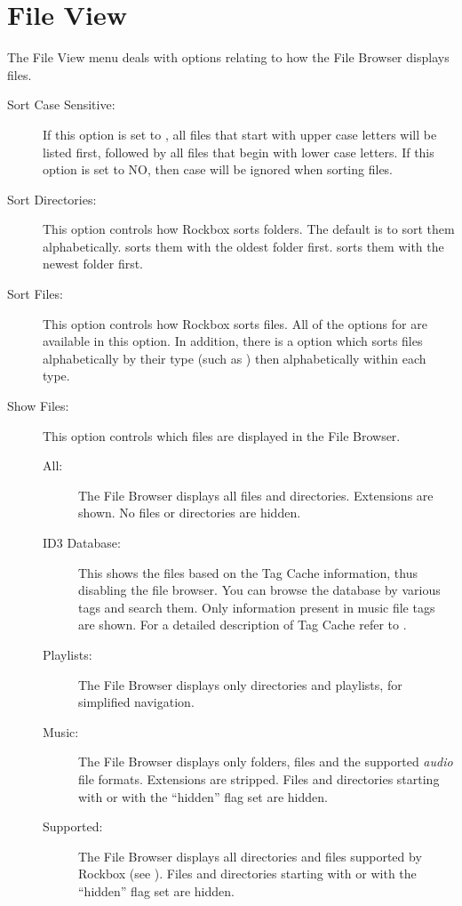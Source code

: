 \section{File View}
  The File View menu deals with options relating to how the File Browser 
  displays files.
  \begin{description}
  \item[Sort Case Sensitive:]
    If this option is set to , all files that start with upper case 
    letters will be listed first, followed by all files that begin with lower 
    case letters.  If this option is set to NO, then case will be ignored when 
    sorting files.
  \item[Sort Directories:]
    This option controls how Rockbox sorts folders.  The default is to sort 
    them alphabetically.  sorts them with the oldest folder first. 
     sorts them with the newest folder first.
    
  \item[Sort Files:]
    This option controls how Rockbox sorts files.  All of the options for 
     are available in this option.  In addition, there 
    is a  option which sorts files alphabetically by their type 
    (such as ) then alphabetically within each type.
    
  \item[\label{ref:ShowFiles}Show Files:]
    This option controls which files are displayed in the File Browser.
    \begin{description}
    \item[All:] The File Browser displays all files and directories. 
      Extensions are shown. No files or directories are hidden.
    \item[ID3 Database:] This shows the files based on the Tag Cache
      information, thus disabling the file browser. You can browse the
      database by various tags and search them. Only information present
      in music file tags are shown. For a detailed description of Tag Cache
      refer to .
    \item[Playlists:] The File Browser displays only directories and playlists,
      for simplified navigation.
    \item[Music:] The File Browser displays only folders,  files 
      and the supported \emph{audio} file formats.  Extensions are stripped.  
      Files and directories starting with  or with the ``hidden'' 
      flag set are hidden.
    \item[Supported:] The File Browser displays all directories and files 
      supported by Rockbox (see ).  
      Files and directories starting with  or with the ``hidden'' 
      flag set are hidden.
    \end{description}
    

\end{description}
